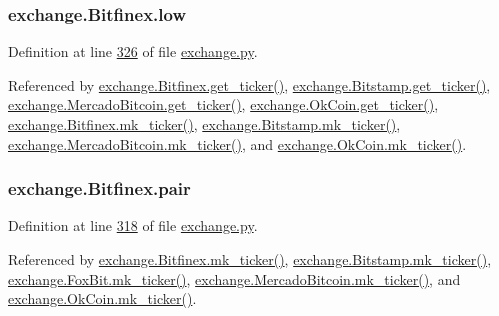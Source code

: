 \subsubsection[{\texorpdfstring{low}{low}}]{\setlength{\rightskip}{0pt plus 5cm}exchange.\+Bitfinex.\+low}\hypertarget{classexchange_1_1_bitfinex_a7d4241119b1fa3860743647a0c6c3416}{}\label{classexchange_1_1_bitfinex_a7d4241119b1fa3860743647a0c6c3416}


Definition at line \hyperlink{exchange_8py_source_l00326}{326} of file \hyperlink{exchange_8py_source}{exchange.\+py}.



Referenced by \hyperlink{exchange_8py_source_l00332}{exchange.\+Bitfinex.\+get\+\_\+ticker()}, \hyperlink{exchange_8py_source_l00401}{exchange.\+Bitstamp.\+get\+\_\+ticker()}, \hyperlink{exchange_8py_source_l00535}{exchange.\+Mercado\+Bitcoin.\+get\+\_\+ticker()}, \hyperlink{exchange_8py_source_l00600}{exchange.\+Ok\+Coin.\+get\+\_\+ticker()}, \hyperlink{exchange_8py_source_l00346}{exchange.\+Bitfinex.\+mk\+\_\+ticker()}, \hyperlink{exchange_8py_source_l00415}{exchange.\+Bitstamp.\+mk\+\_\+ticker()}, \hyperlink{exchange_8py_source_l00549}{exchange.\+Mercado\+Bitcoin.\+mk\+\_\+ticker()}, and \hyperlink{exchange_8py_source_l00614}{exchange.\+Ok\+Coin.\+mk\+\_\+ticker()}.

\subsubsection[{\texorpdfstring{pair}{pair}}]{\setlength{\rightskip}{0pt plus 5cm}exchange.\+Bitfinex.\+pair}\hypertarget{classexchange_1_1_bitfinex_a901a5499667f1f2b391bc9dbbfe1c1c7}{}\label{classexchange_1_1_bitfinex_a901a5499667f1f2b391bc9dbbfe1c1c7}


Definition at line \hyperlink{exchange_8py_source_l00318}{318} of file \hyperlink{exchange_8py_source}{exchange.\+py}.



Referenced by \hyperlink{exchange_8py_source_l00346}{exchange.\+Bitfinex.\+mk\+\_\+ticker()}, \hyperlink{exchange_8py_source_l00415}{exchange.\+Bitstamp.\+mk\+\_\+ticker()}, \hyperlink{exchange_8py_source_l00474}{exchange.\+Fox\+Bit.\+mk\+\_\+ticker()}, \hyperlink{exchange_8py_source_l00549}{exchange.\+Mercado\+Bitcoin.\+mk\+\_\+ticker()}, and \hyperlink{exchange_8py_source_l00614}{exchange.\+Ok\+Coin.\+mk\+\_\+ticker()}.


